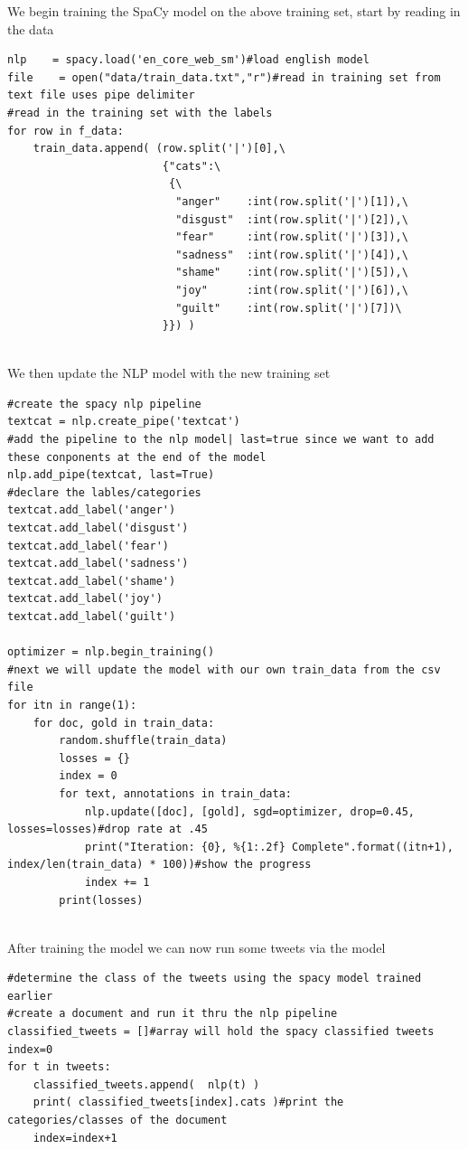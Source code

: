 We begin training the SpaCy model on the above training set,
start by reading in the data 
\begin{lstlisting}
nlp    = spacy.load('en_core_web_sm')#load english model
file    = open("data/train_data.txt","r")#read in training set from text file uses pipe delimiter
#read in the training set with the labels
for row in f_data:
    train_data.append( (row.split('|')[0],\
                        {"cats":\
                         {\
                          "anger"    :int(row.split('|')[1]),\
                          "disgust"  :int(row.split('|')[2]),\
                          "fear"     :int(row.split('|')[3]),\
                          "sadness"  :int(row.split('|')[4]),\
                          "shame"    :int(row.split('|')[5]),\
                          "joy"      :int(row.split('|')[6]),\
                          "guilt"    :int(row.split('|')[7])\
                        }}) )
                        
\end{lstlisting}
\clearpage
We then update the NLP model with the new training set
\begin{lstlisting}
#create the spacy nlp pipeline
textcat = nlp.create_pipe('textcat')
#add the pipeline to the nlp model| last=true since we want to add these conponents at the end of the model
nlp.add_pipe(textcat, last=True)
#declare the lables/categories
textcat.add_label('anger')
textcat.add_label('disgust')
textcat.add_label('fear')
textcat.add_label('sadness')
textcat.add_label('shame')
textcat.add_label('joy')
textcat.add_label('guilt')

optimizer = nlp.begin_training()
#next we will update the model with our own train_data from the csv file
for itn in range(1):
    for doc, gold in train_data:
        random.shuffle(train_data)
        losses = {}
        index = 0
        for text, annotations in train_data:
            nlp.update([doc], [gold], sgd=optimizer, drop=0.45, losses=losses)#drop rate at .45
            print("Iteration: {0}, %{1:.2f} Complete".format((itn+1), index/len(train_data) * 100))#show the progress
            index += 1
        print(losses)
 
\end{lstlisting}


After training the model we can now run some tweets via the model 
\begin{lstlisting}
#determine the class of the tweets using the spacy model trained earlier
#create a document and run it thru the nlp pipeline 
classified_tweets = []#array will hold the spacy classified tweets
index=0
for t in tweets:
    classified_tweets.append(  nlp(t) )
    print( classified_tweets[index].cats )#print the categories/classes of the document
    index=index+1  
\end{lstlisting}

